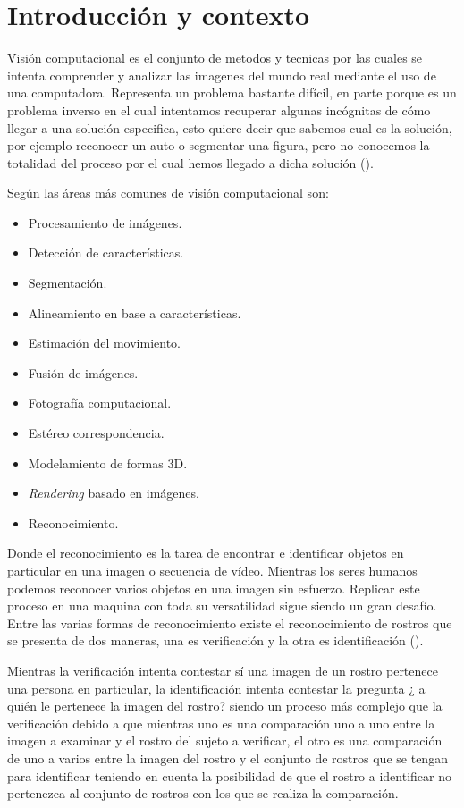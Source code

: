 \chapter{Introducción y contexto}\label{chap:Intro}

Visión computacional es el conjunto de metodos y tecnicas por las cuales se intenta comprender y analizar las imagenes del mundo real mediante el uso de una computadora.
Representa un problema bastante difícil, en parte porque es un problema inverso en el cual intentamos recuperar algunas incógnitas de cómo llegar a una solución especifica, esto quiere decir que sabemos cual es la solución, por ejemplo reconocer un auto o segmentar una figura, pero no conocemos la totalidad del proceso por el cual hemos llegado a dicha solución (\cite{szeliski2010computer}). 

Según \cite{szeliski2010computer} las áreas más comunes de visión computacional son: 
\begin{itemize}
\item Procesamiento de imágenes.
\item Detección de características.
\item Segmentación.
\item Alineamiento en base a características.
\item Estimación del movimiento.
\item Fusión de imágenes.
\item Fotografía computacional.
\item Estéreo correspondencia.
\item Modelamiento de formas 3D.
\item \textit{Rendering} basado en imágenes.
\item Reconocimiento.
\end{itemize}

Donde el reconocimiento es la tarea de encontrar e identificar objetos en particular en una imagen o secuencia de vídeo. Mientras los seres humanos podemos reconocer varios objetos en una imagen sin esfuerzo. Replicar este proceso en una maquina con toda su versatilidad sigue siendo un gran desafío.
Entre las varias formas de reconocimiento existe el reconocimiento de rostros que se presenta de dos maneras, una es verificación y la otra es identificación (\cite{alice2003biometric}).

Mientras la verificación intenta contestar sí una imagen de un rostro pertenece una persona en particular, la identificación intenta contestar la pregunta ¿ a quién le pertenece la imagen del rostro? siendo un proceso más complejo que la verificación debido a que mientras uno es una comparación uno a uno entre la imagen a examinar y el rostro del sujeto a verificar, el otro es una comparación de uno a varios entre la imagen del rostro y el conjunto de rostros que se tengan para identificar teniendo en cuenta la posibilidad de que el rostro a identificar no pertenezca al conjunto de rostros con los que se realiza la comparación.

